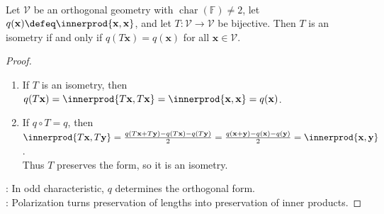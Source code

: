 \begin{proposition} \label{prop:orthogonal-isometry-preserves-quadratic-form} \\
Let $\mathcal{V}$ be an orthogonal geometry with $\operatorname{char}(\mathbb{F})\neq2$, let $q(\mathbf{x})\defeq\innerprod{\mathbf{x},\mathbf{x}}$, and let $T:\mathcal{V}\to\mathcal{V}$ be bijective. Then $T$ is an isometry if and only if $q(T\mathbf{x})=q(\mathbf{x})$ for all $\mathbf{x}\in\mathcal{V}$.
\begin{proof}
\begin{enumerate}[label=\roman*.]
\setlength{\itemsep}{0pt}
\item[$(\Rightarrow)$] If $T$ is an isometry, then $q(T\mathbf{x})=\innerprod{T\mathbf{x},T\mathbf{x}}=\innerprod{\mathbf{x},\mathbf{x}}=q(\mathbf{x})$.
\item[$(\Leftarrow)$] If $q\circ T=q$, then $\innerprod{T\mathbf{x},T\mathbf{y}} =\frac{q(T\mathbf{x}+T\mathbf{y})-q(T\mathbf{x})-q(T\mathbf{y})}{2} =\frac{q(\mathbf{x}+\mathbf{y})-q(\mathbf{x})-q(\mathbf{y})}{2} =\innerprod{\mathbf{x},\mathbf{y}}$.\\
Thus $T$ preserves the form, so it is an isometry.
\end{enumerate}
: In odd characteristic, $q$ determines the orthogonal form.\\
: Polarization turns preservation of lengths into preservation of inner products.
\end{proof}
\end{proposition}

